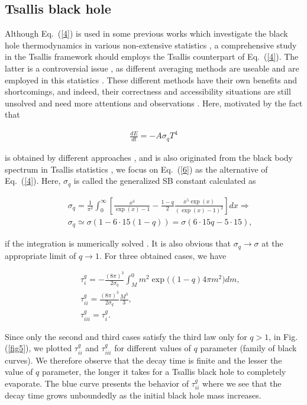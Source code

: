 \documentclass[twocolumn,preprintnumbers,amsmath,nofootinbib,amssymb]{revtex4}
\begin{document}
\subsection{Tsallis black hole}

Although Eq.~(\ref{4}) is used in some previous works which
investigate the black hole thermodynamics in various non-extensive
statistics \cite{epl,refgerg,gerg,mesri2}, a comprehensive study
in the Tsallis framework should employs the Tsallis counterpart of
Eq.~(\ref{4}). The latter is a controversial issue
\cite{tbbr1,tbbr2,tbbr3,kol}, as different averaging methods are
useable and are employed in this statistics \cite{kol}. These
different methods have their own benefits and shortcomings, and
indeed, their correctness and accessibility situations are still
unsolved and need more attentions and observations \cite{kol}.
Here, motivated by the fact that

\begin{eqnarray}\label{6}
\frac{dE}{dt}=-A\sigma_q T^4
\end{eqnarray}

\noindent is obtained by different approaches \cite{tbbr1}, and is
also originated from the black body spectrum in Tsallis statistics
\cite{tbbs}, we focus on Eq.~(\ref{6}) as the alternative of
Eq.~(\ref{4}). Here, $\sigma_q$ is called the generalized SB
constant calculated as \cite{tbbr1}

\begin{eqnarray}\label{7}
&&\sigma_q=\frac{1}{\pi^2}\int_0^\infty\left[\frac{x^3}{\exp(x)-1}-\frac{1-q}{2}\frac{x^5\exp(x)}{(\exp(x)-1)^2}\right]dx\Rightarrow\nonumber\\
&&\sigma_q\simeq\sigma(1-6\cdot15(1-q))=\sigma(6\cdot15q-5\cdot15),
\end{eqnarray}

\noindent if the integration is numerically solved \cite{tbbr1}.
It is also obvious that $\sigma_q\rightarrow\sigma$ at the
appropriate limit of $q\rightarrow1$. For three obtained cases, we
have

\begin{eqnarray}\label{8}
&&\!\!\!\!\!\!\!\tau_i^{q}=-\frac{(8\pi)^3}{2\sigma_q}\int_M^0m^2\exp\big((1-q)4\pi m^2\big)dm,\nonumber\\
&&\!\!\!\!\!\!\!\tau_{ii}^{q}=\frac{(8\pi)^3}{2\sigma_q}\frac{M^3}{3},\\\nonumber
&&\!\!\!\!\!\!\!\tau_{iii}^{q}=\tau_i^{q}.
\end{eqnarray}

\noindent Since only the second and third cases satisfy the third
law only for $q>1$, in Fig. (\ref{fig5}), we plotted
$\tau_{ii}^{q}$ and $\tau_{iii}^{q}$ for different values of $q$
parameter (family of black curves). We therefore observe that the
decay time is finite and the lesser the value of $q$ parameter,
the longer it takes for a Tsallis black hole to completely
evaporate. The blue curve presents the behavior of $\tau_{ii}^{q}$
where we see that the decay time grows unboundedly as the initial
black hole mass increases.
\end{document}
